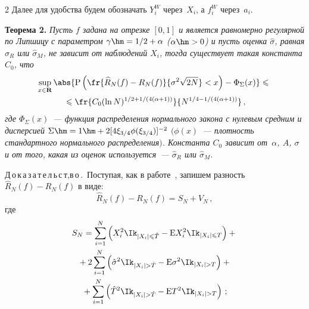 \begin{multicols}{2}
Далее для удобства будем обозначать $Y_i^W$ через~$X_i$, а $f_i^W$ через~$a_i$.

\medskip

\noindent
\textbf{Теорема 2.} \textit{Пусть $f$ задана на отрезке $[0,1]$ и является 
равномерно регулярной по Липшицу с параметром $\gamma\hm={1}/{2}+\alpha$ 
($\alpha\hm>0$) и пусть оценка $\hat{\sigma}$, равная $\hat{\sigma}_{R}$ или $\hat{\sigma}_{M}$, 
не зависит от наблюдений $X_i$, тогда существует такая константа $C_0$, что}
\begin{multline}
\sup\limits_{x\in\mathbf{R}}\abs{\mbox{P}\left(
\fr{\widehat{R}_N(f)-R_N(f)}{\sigma^2\sqrt{2N}}<x\right)-
\Phi_\Sigma(x)}\leqslant{}\\
{}\leqslant\fr{C_0(\ln N)^{{1}/{2}+{1}/(4(\alpha+1))}}{N^{{1}/{4}-
{1}/(4(\alpha+1))}}\,,\label{e7sh}
\end{multline}
\textit{где $\Phi_\Sigma(x)$~--- функция распределения нормального закона с нулевым средним и 
дисперсией $\Sigma\hm=1\hm+2[4\xi_{3/4}\phi(\xi_{3/4})]^{-2}$ $($$\phi(x)$~--- 
плотность стандартного нормального распределения$)$. Константа $C_0$ зависит от~$\alpha$, 
$A$, $\sigma$ и от того, какая из оценок используется~--- 
$\hat{\sigma}_{R}$ или $\hat{\sigma}_{M}$}.

\medskip

\noindent
Д\,о\,к\,а\,з\,а\,т\,е\,л\,ь\,с\,т,в\,о\,.\ Поступая, как в работе~\cite{8sh}, 
запишем разность $\widehat{R}_N(f)-R_N(f)$ в виде:
$$
\widehat{R}_N(f)-R_N(f)=S_N+V_N\,,
$$
где
\begin{multline*}
S_N=\sum\limits_{i=1}^{N}\left(X_i^2\Ik_{|X_i|\leqslant 
\hat{T}}-\mbox{E}X_i^2\Ik_{|X_i|\leqslant T}\right)+{}\\
{}+2\sum\limits_{i=1}^{N}\left(\hat{\sigma}^2\Ik_{|X_i|> \hat{T}}-
\mbox{E}\sigma^2\Ik_{|X_i|> T}\right)+{}
\\
{}+\sum_{i=1}^{N}\left(\hat{T}^2\Ik_{|X_i|> \hat{T}}-
\mbox{E}T^2\Ik_{|X_i|> T}\right)\,;
\end{multline*}

\vspace*{-3pt}


\end{multicols}
